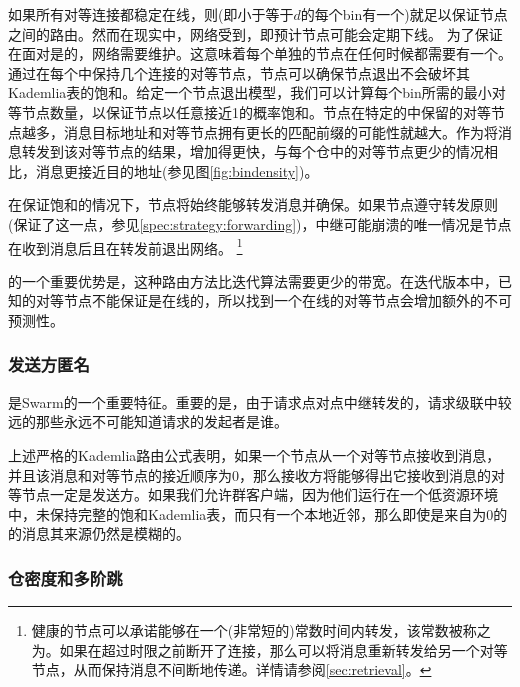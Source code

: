 如果所有对等连接都稳定在线，则(即小于等于$d$的每个bin有一个)就足以保证节点之间的路由。然而在现实中，网络受到，即预计节点可能会定期下线。 为了保证在面对是的，网络需要维护。这意味着每个单独的节点在任何时候都需要有一个。通过在每个中保持几个连接的对等节点，节点可以确保节点退出不会破坏其Kademlia表的饱和。给定一个节点退出模型，我们可以计算每个bin所需的最小对等节点数量，以保证节点以任意接近1的概率饱和。节点在特定的中保留的对等节点越多，消息目标地址和对等节点拥有更长的匹配前缀的可能性就越大。作为将消息转发到该对等节点的结果，增加得更快，与每个仓中的对等节点更少的情况相比，消息更接近目的地址(参见图\ref{fig:bindensity})。



在保证饱和的情况下，节点将始终能够转发消息并确保。如果节点遵守转发原则(保证了这一点，参见\ref{spec:strategy:forwarding})，中继可能崩溃的唯一情况是节点在收到消息后且在转发前退出网络。%
%
\footnote{健康的节点可以承诺能够在一个(非常短的)常数时间内转发，该常数被称之为。如果在超过时限之前断开了连接，那么可以将消息重新转发给另一个对等节点，从而保持消息不间断地传递。详情请参阅\ref{sec:retrieval}。
}

的一个重要优势是，这种路由方法比迭代算法需要更少的带宽。在迭代版本中，已知的对等节点不能保证是在线的，所以找到一个在线的对等节点会增加额外的不可预测性。

\subsubsection{发送方匿名}
是Swarm的一个重要特征。重要的是，由于请求点对点中继转发的，请求级联中较远的那些永远不可能知道请求的发起者是谁。

上述严格的Kademlia路由公式表明，如果一个节点从一个对等节点接收到消息，并且该消息和对等节点的接近顺序为$0$，那么接收方将能够得出它接收到消息的对等节点一定是发送方。如果我们允许群客户端，因为他们运行在一个低资源环境中，未保持完整的饱和Kademlia表，而只有一个本地近邻，那么即使是来自为$0$的的消息其来源仍然是模糊的。 

\subsubsection{仓密度和多阶跳} \label{sec:bindensity}

